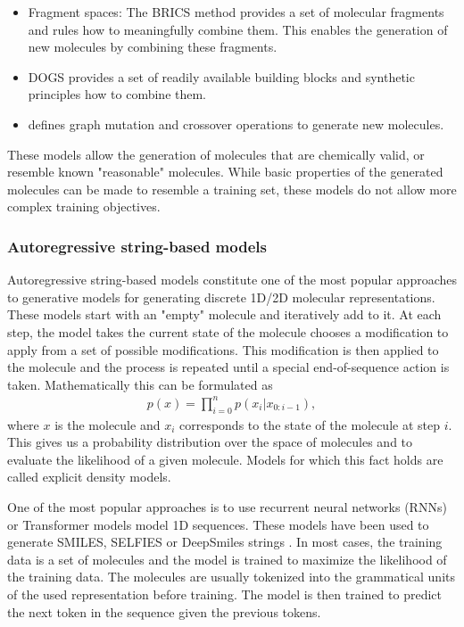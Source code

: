 \begin{itemize}
    \item Fragment spaces: The BRICS \citep{degenArtCompilingUsing2008} method
    provides a set of molecular fragments and rules how to meaningfully combine
    them. This enables the generation of new molecules by combining these
    fragments.
    \item DOGS \citep{hartenfellerDOGSReactionDrivenNovo2012} provides a 
    set of readily available building blocks and synthetic principles how to 
    combine them. 
    \item \citep{jensenGraphbasedGeneticAlgorithm2019} defines graph mutation 
    and crossover operations to generate new molecules. 
\end{itemize}
These models allow the generation of molecules that are chemically valid, 
or resemble known "reasonable" molecules. While basic properties of 
the generated molecules can be made to resemble a training set, 
these models do not allow more complex training objectives. 

\subsubsection{Autoregressive string-based models}
Autoregressive string-based models constitute one of the most popular approaches
to generative models for generating discrete 1D/2D molecular representations. 
These models start with an "empty" molecule and iteratively add to it. 
At each step, the model takes the current state of the molecule chooses 
a modification to apply from a set of possible modifications. This modification
is then applied to the molecule and the process is repeated until a special
end-of-sequence action is taken. Mathematically this can be formulated as
\begin{align}
    p(x) = \prod_{i=0}^n p(x_i | x_{0:i-1}), 
\end{align}
where $x$ is the molecule and $x_i$ corresponds to the state of the molecule 
at step $i$. This gives us a probability distribution over the space of molecules
and to evaluate the likelihood of a given molecule. Models for which this fact 
holds are called explicit density models.

One of the most popular approaches is to use recurrent neural networks (RNNs)
or Transformer models \citep{vaswaniAttentionAllYou2017} model 1D sequences.
These models have been used to generate SMILES, SELFIES or DeepSmiles strings
\citep{seglerGeneratingFocusedMolecule2018,todo}. 
In most cases, the training data is a set of molecules and the model is trained
to maximize the likelihood of the training data. The molecules are usually
tokenized into the grammatical units of the used representation before training. 
The model is then trained to predict the next token in the sequence given the
previous tokens.

